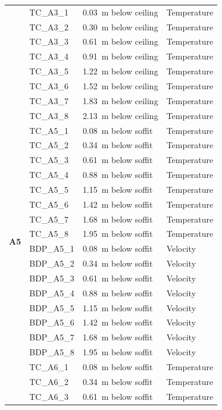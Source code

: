 \documentclass[12pt,oneside]{book}
\begin{document}
\begin{longtable}[c]{c|lll}
 \newpage
 \multirow{10}{*}{\large{\textbf{A3}}}
 & TC\_A3\_1  & 0.03~m below ceiling & Temperature \\
 & TC\_A3\_2  & 0.30~m below ceiling & Temperature \\
 & TC\_A3\_3  & 0.61~m below ceiling & Temperature \\
 & TC\_A3\_4  & 0.91~m below ceiling & Temperature \\
 & TC\_A3\_5  & 1.22~m below ceiling & Temperature \\
 & TC\_A3\_6  & 1.52~m below ceiling & Temperature \\
 & TC\_A3\_7  & 1.83~m below ceiling & Temperature \\
 & TC\_A3\_8  & 2.13~m below ceiling & Temperature \\
 \midrule
\multirow{16}{*}{\large{\textbf{A5}}}
 & TC\_A5\_1  & 0.08~m below soffit  & Temperature \\
 & TC\_A5\_2  & 0.34~m below soffit  & Temperature \\
 & TC\_A5\_3  & 0.61~m below soffit  & Temperature \\
 & TC\_A5\_4  & 0.88~m below soffit  & Temperature \\
 & TC\_A5\_5  & 1.15~m below soffit  & Temperature \\
 & TC\_A5\_6  & 1.42~m below soffit  & Temperature \\
 & TC\_A5\_7  & 1.68~m below soffit  & Temperature \\
 & TC\_A5\_8  & 1.95~m below soffit  & Temperature \\
\cline{2-4}
 & BDP\_A5\_1 & 0.08~m below soffit  & Velocity \\
 & BDP\_A5\_2 & 0.34~m below soffit  & Velocity \\
 & BDP\_A5\_3 & 0.61~m below soffit  & Velocity \\
 & BDP\_A5\_4 & 0.88~m below soffit  & Velocity \\
 & BDP\_A5\_5 & 1.15~m below soffit  & Velocity \\
 & BDP\_A5\_6 & 1.42~m below soffit  & Velocity \\
 & BDP\_A5\_7 & 1.68~m below soffit  & Velocity \\
 & BDP\_A5\_8 & 1.95~m below soffit  & Velocity \\
\bottomrule
\newpage
\multirow{16}{*}{\large{\textbf{A6}}}
 & TC\_A6\_1  & 0.08~m below soffit  & Temperature \\
 & TC\_A6\_2  & 0.34~m below soffit  & Temperature \\
 & TC\_A6\_3  & 0.61~m below soffit  & Temperature \\

\end{longtable}
\end{document}
